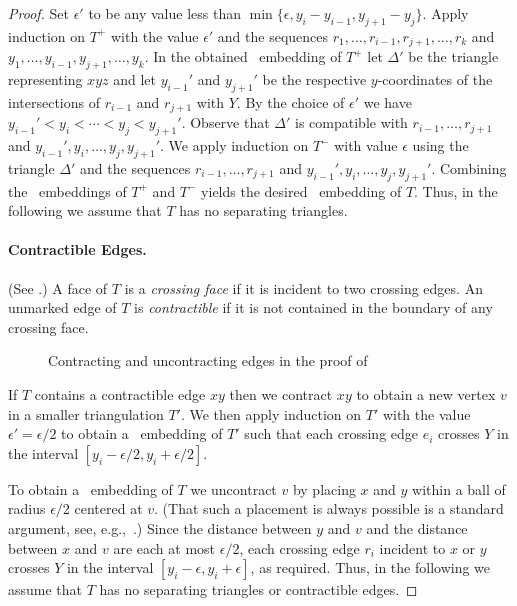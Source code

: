 \begin{proof}
	Set $\epsilon'$ to be any
	value less than $\min\{\epsilon,y_{i}-y_{i-1}, y_{j+1}-y_j\}$. Apply induction on $T^+$ with the value $\epsilon'$ and the sequences $r_1,\ldots,r_{i-1},r_{j+1},\ldots,r_k$ and
	$y_1,\ldots,y_{i-1},y_{j+1},\ldots,y_k$. In the obtained \Fary\ embedding of $T^+$ let $\Delta'$ be the triangle representing  $xyz$ and let $y_{i-1}'$ and $y_{j+1}'$
	be the respective $y$-coordinates of the intersections of
	$r_{i-1}$ and $r_{j+1}$ with $Y$.  By the choice of
	$\epsilon'$ we have $y_{i-1}'<y_i<\cdots<y_j<y_{j+1}'$.  Observe that
	$\Delta'$ is compatible with $r_{i-1},\ldots,r_{j+1}$ and
	$y_{i-1}',y_i,\ldots,y_j,y_{j+1}'$.
	We apply induction on $T^-$ with value $\epsilon$ using the triangle $\Delta'$ and the sequences $r_{i-1},\ldots,r_{j+1}$ and
	$y_{i-1}',y_i,\ldots,y_{j},y_{j+1}'$.  Combining the \Fary\ embeddings of $T^+$
	and $T^-$ yields the desired \Fary\ embedding of $T$.  Thus, in the following we assume that $T$ has no separating triangles.
	
	\paragraph{Contractible Edges.}
	(See .)
	A face of $T$ is a \emph{crossing
		face} if it is incident to two crossing edges.  An
	unmarked edge of $T$ is \emph{contractible} if it is not contained
	in the boundary of any crossing face.  
	\begin{figure}
		\caption{Contracting and uncontracting edges in the proof of
			}
	\end{figure}
	
	If $T$ contains a contractible edge $xy$ then we contract $xy$ to
	obtain a new vertex $v$ in a smaller triangulation $T'$.   We then apply
	induction on $T'$ with the value $\epsilon'=\epsilon/2$ to obtain a \Fary\
	embedding of $T'$ such that each crossing edge $e_i$ crosses
	$Y$ in the interval $[y_i-\epsilon/2,y_i+\epsilon/2]$.
	
	To obtain a \Fary\ embedding of $T$ we uncontract $v$ by placing $x$ and $y$
	within a ball of radius $\epsilon/2$ centered at $v$. (That such
	a placement is always possible is a standard argument, see, e.g.,~\cite{fary,w-sp-05}.)  Since the
	distance between $y$ and $v$ and the distance between $x$ and $v$ are each at most $\epsilon/2$,
	each crossing edge $r_i$ incident to $x$ or $y$ crosses $Y$ in the interval $[y_i-\epsilon,y_i+\epsilon]$, as required.
	Thus, in the following we assume that $T$ has no separating triangles or contractible
	edges.
	

\end{proof}
